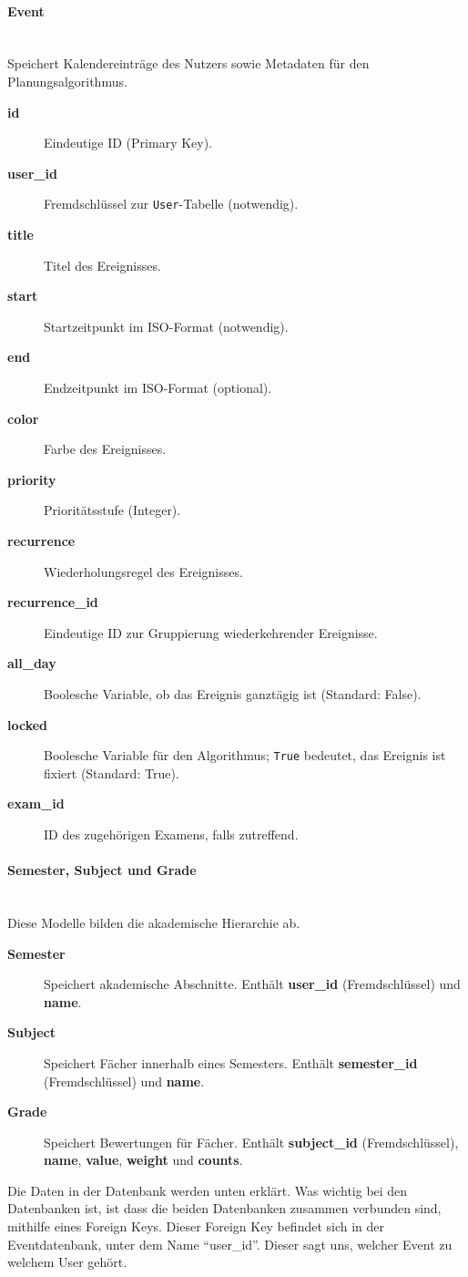 \documentclass[12pt,a4paper]{report}
\newcommand{\myparagraph}[1]{\paragraph{#1}\mbox{}\\}
\begin{document}
\myparagraph{Event}
Speichert Kalendereinträge des Nutzers sowie Metadaten für den Planungsalgorithmus.
\begin{description}
    \item[\textbf{id}] Eindeutige ID (Primary Key).
    \item[\textbf{user\_id}] Fremdschlüssel zur \texttt{User}-Tabelle (notwendig).
    \item[\textbf{title}] Titel des Ereignisses.
    \item[\textbf{start}] Startzeitpunkt im ISO-Format (notwendig).
    \item[\textbf{end}] Endzeitpunkt im ISO-Format (optional).
    \item[\textbf{color}] Farbe des Ereignisses.
    \item[\textbf{priority}] Prioritätsstufe (Integer).
    \item[\textbf{recurrence}] Wiederholungsregel des Ereignisses.
    \item[\textbf{recurrence\_id}] Eindeutige ID zur Gruppierung wiederkehrender Ereignisse.
    \item[\textbf{all\_day}] Boolesche Variable, ob das Ereignis ganztägig ist (Standard: False).
    \item[\textbf{locked}] Boolesche Variable für den Algorithmus; \texttt{True} bedeutet, das Ereignis ist fixiert (Standard: True).
    \item[\textbf{exam\_id}] ID des zugehörigen Examens, falls zutreffend.
\end{description}

\myparagraph{Semester, Subject und Grade}
Diese Modelle bilden die akademische Hierarchie ab.
\begin{description}
    \item[\textbf{Semester}] Speichert akademische Abschnitte. Enthält \textbf{user\_id} (Fremdschlüssel) und \textbf{name}.
    \item[\textbf{Subject}] Speichert Fächer innerhalb eines Semesters. Enthält \textbf{semester\_id} (Fremdschlüssel) und \textbf{name}.
    \item[\textbf{Grade}] Speichert Bewertungen für Fächer. Enthält \textbf{subject\_id} (Fremdschlüssel), \textbf{name}, \textbf{value}, \textbf{weight} und \textbf{counts}.
\end{description}

Die Daten in der Datenbank werden unten erklärt. Was wichtig bei den Datenbanken ist, ist dass die beiden Datenbanken zusammen verbunden sind, mithilfe eines Foreign Keys. Dieser Foreign Key befindet sich in der Eventdatenbank, unter dem Name \enquote{user\_id}. Dieser sagt uns, welcher Event zu welchem User gehört.
\end{document}

